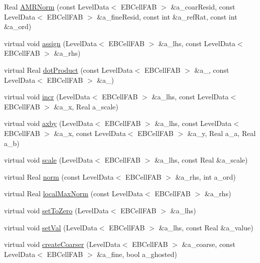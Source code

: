 \begin{DoxyCompactItemize}
\item 
Real \hyperlink{classebconductivityop_a659c169ba84e808e6e254e735f1d93f1}{A\+M\+R\+Norm} (const Level\+Data$<$ E\+B\+Cell\+F\+AB $>$ \&a\+\_\+coar\+Resid, const Level\+Data$<$ E\+B\+Cell\+F\+AB $>$ \&a\+\_\+fine\+Resid, const int \&a\+\_\+ref\+Rat, const int \&a\+\_\+ord)
\item 
virtual void \hyperlink{classebconductivityop_ab7a2ab76f65385fede5ac56d6cf83fcd}{assign} (Level\+Data$<$ E\+B\+Cell\+F\+AB $>$ \&a\+\_\+lhs, const Level\+Data$<$ E\+B\+Cell\+F\+AB $>$ \&a\+\_\+rhs)
\item 
virtual Real \hyperlink{classebconductivityop_ab909b1c50c51c6b8ed74d269fe122a97}{dot\+Product} (const Level\+Data$<$ E\+B\+Cell\+F\+AB $>$ \&a\+\_, const Level\+Data$<$ E\+B\+Cell\+F\+AB $>$ \&a\+\_)
\item 
virtual void \hyperlink{classebconductivityop_a3a8d0f9230bd7ba994ce6eb9feb72cfc}{incr} (Level\+Data$<$ E\+B\+Cell\+F\+AB $>$ \&a\+\_\+lhs, const Level\+Data$<$ E\+B\+Cell\+F\+AB $>$ \&a\+\_\+x, Real a\+\_\+scale)
\item 
virtual void \hyperlink{classebconductivityop_a32ef51f674682ebf662247372aa2ad43}{axby} (Level\+Data$<$ E\+B\+Cell\+F\+AB $>$ \&a\+\_\+lhs, const Level\+Data$<$ E\+B\+Cell\+F\+AB $>$ \&a\+\_\+x, const Level\+Data$<$ E\+B\+Cell\+F\+AB $>$ \&a\+\_\+y, Real a\+\_\+a, Real a\+\_\+b)
\item 
virtual void \hyperlink{classebconductivityop_ae09e66400ffb7da031a6e4c46b712e0a}{scale} (Level\+Data$<$ E\+B\+Cell\+F\+AB $>$ \&a\+\_\+lhs, const Real \&a\+\_\+scale)
\item 
virtual Real \hyperlink{classebconductivityop_ae5a3657c8704cdeb157604ba202418e9}{norm} (const Level\+Data$<$ E\+B\+Cell\+F\+AB $>$ \&a\+\_\+rhs, int a\+\_\+ord)
\item 
virtual Real \hyperlink{classebconductivityop_a5fe47b4e0c1fd06541f75b859736f6aa}{local\+Max\+Norm} (const Level\+Data$<$ E\+B\+Cell\+F\+AB $>$ \&a\+\_\+rhs)
\item 
virtual void \hyperlink{classebconductivityop_a43a2f5eb372088e94355c8a2cdf3b77f}{set\+To\+Zero} (Level\+Data$<$ E\+B\+Cell\+F\+AB $>$ \&a\+\_\+lhs)
\item 
virtual void \hyperlink{classebconductivityop_ae9cabe993be966a3ca72f2b8baa1023d}{set\+Val} (Level\+Data$<$ E\+B\+Cell\+F\+AB $>$ \&a\+\_\+lhs, const Real \&a\+\_\+value)
\item 
virtual void \hyperlink{classebconductivityop_a212cb5f87dd23ef4bbf502372092a8e1}{create\+Coarser} (Level\+Data$<$ E\+B\+Cell\+F\+AB $>$ \&a\+\_\+coarse, const Level\+Data$<$ E\+B\+Cell\+F\+AB $>$ \&a\+\_\+fine, bool a\+\_\+ghosted)

\end{DoxyCompactItemize}
